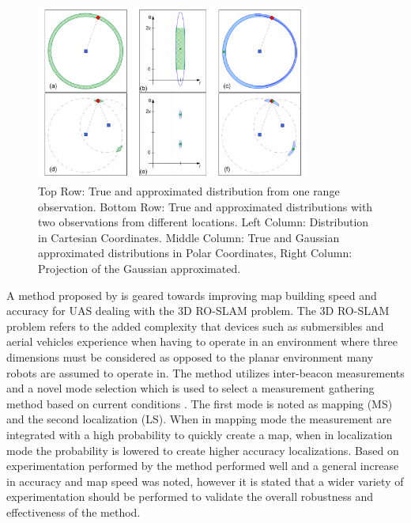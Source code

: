\documentclass[conference]{IEEEtran}
\begin{document}
	\begin{figure}[h!]
		
		\centering
		
		\includegraphics[width=90mm]{ROP_djugash.png}
		
		\caption{Top Row: True and approximated distribution from one range observation. Bottom Row: True and approximated distributions with two observations from different locations. Left Column: Distribution in Cartesian Coordinates. Middle Column: True and Gaussian approximated distributions in Polar Coordinates, Right Column: Projection of the Gaussian approximated. \cite{Djugash2008}} 
		
		\label{ROP_djugash}
		
	\end{figure}
	

	
	
	
	
	
	A method proposed by \cite{Dios2015} is geared towards improving map building speed and accuracy for UAS dealing with the 3D RO-SLAM problem. The 3D RO-SLAM problem refers to the added complexity that devices such as submersibles \cite{Newman} and aerial vehicles experience when having to operate in an environment where three dimensions must be considered as opposed to the planar environment many robots are assumed to operate in. The method utilizes inter-beacon measurements and a novel mode selection which is used to select a measurement gathering method based on current conditions \cite{Dios2015}. The first mode is noted as mapping (MS) and the second localization (LS). When in mapping mode the measurement are integrated with a high probability to quickly create a map, when in localization mode the probability is lowered to create higher accuracy localizations. Based on experimentation performed by \cite{Dios2015} the method performed well and a general increase in accuracy and map speed was noted, however it is stated that a wider variety of experimentation should be performed to validate the overall robustness and effectiveness of the method.
	
\end{document}
